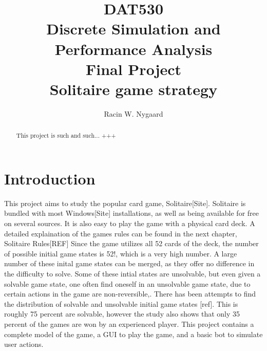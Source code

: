 \documentclass[runningheads,a4paper]{llncs}
\begin{document}
\mainmatter  %
\title{DAT530\\Discrete Simulation and Performance Analysis\\Final Project\\Solitaire game strategy}
\author{Racin W. Nygaard}

\tocauthor{ }
\maketitle
	


\begin{abstract}
This project is such and such... +++

\end{abstract}

\setcounter{tocdepth}{2}
\tableofcontents
\listoffigures
\listoftables
\section{Introduction}
This project aims to study the popular card game, Solitaire[Site]. Solitaire is bundled with most Windows[Site] installations, as well as being available for free on several sources. It is also easy to play the game with a physical card deck. A detailed explaination of the games rules can be found in the next chapter, Solitaire Rules[REF]
\newline
Since the game utilizes all 52 cards of the deck, the number of possible initial game states is 52!, which is a very high number. A large number of these inital game states can be merged, as they offer no difference in the difficulty to solve. Some of these intial states are unsolvable, but even given a solvable game state, one often find oneself in an unsolvable game state, due to certain actions in the game are non-reversible,. There has been attempts to find the distribution of solvable and unsolvable initial game states [ref]. This is roughly 75 percent are solvable, however the study also shows that only 35 percent of the games are won by an experienced player.
\newline
This project contains a complete model of the game, a GUI to play the game, and a basic bot to simulate user actions. 
\end{document}
